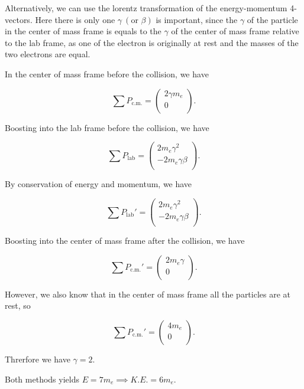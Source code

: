 \documentclass[english,a4paper,12pt]{report}
\begin{document}
{Alternatively, we can use the lorentz transformation of the energy-momentum 4-vectors. Here there is only one \(\gamma ~(\text {or } \beta )\) is important, since the \(\gamma \) of the particle in the center of mass frame is equals to the \(\gamma \) of the center of mass frame relative to the lab frame, as one of the electron is originally at rest and the masses of the two electrons are equal.

In the center of mass frame before the collision, we have 

\begin{equation}
    \sum P_{\text{c.m.} }  = \begin{pmatrix}
         2\gamma  m_{e}  \\
         0 \\
    \end{pmatrix}.
\end{equation}

Boosting into the lab frame before the collision, we have

\begin{equation}
    \sum P_{\text{lab} } = \begin{pmatrix}
         2 m_{e} \gamma^2   \\
         -2 m_{e} \gamma\beta  \\
    \end{pmatrix}.
\end{equation}

By conservation of energy and momentum, we have

\begin{equation}
    \sum P_{\text{lab}}' = \begin{pmatrix}
         2 m_{e} \gamma ^2 \\
         -2 m_{e} \gamma \beta  \\
    \end{pmatrix}. 
\end{equation}

Boosting into the center of mass frame after the collision, we have

\begin{equation}
    \sum P_{\text{c.m.} }' = \begin{pmatrix}
         2 m_{e} \gamma  \\
         0 \\
    \end{pmatrix}.
\end{equation}

However, we also know that in the center of mass frame all the particles are at rest, so 

\begin{equation}
    \sum P_{\text{c.m.} }' = \begin{pmatrix}
         4 m_{e}  \\
         0 \\
    \end{pmatrix}.
\end{equation}

Threrfore we have \(\gamma = 2\).

Both methods yields \(E = 7m_{e} \implies K.E. = 6m_{e} \). 
}
\end{document}
